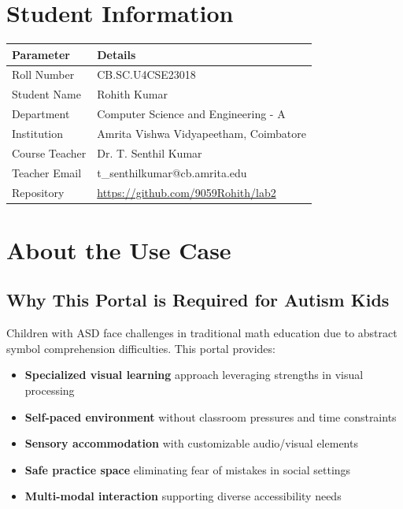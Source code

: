 \documentclass[11pt, a4paper]{article}
\begin{document}
\section{Student Information}

\vspace{0.3cm}
\renewcommand{\arraystretch}{1.4}
\begin{tabular}{ll}
\toprule
\textbf{Parameter} & \textbf{Details} \\
\midrule
Roll Number & CB.SC.U4CSE23018 \\
Student Name & Rohith Kumar \\
Department & Computer Science and Engineering - A \\
Institution & Amrita Vishwa Vidyapeetham, Coimbatore \\
Course Teacher & Dr. T. Senthil Kumar \\
Teacher Email & t\_senthilkumar@cb.amrita.edu \\
Repository & \url{https://github.com/9059Rohith/lab2} \\
\bottomrule
\end{tabular}
\renewcommand{\arraystretch}{1}
\vspace{0.4cm}

\section{About the Use Case}

\subsection{Why This Portal is Required for Autism Kids}

Children with ASD face challenges in traditional math education due to abstract symbol comprehension difficulties. This portal provides:
\begin{itemize}[leftmargin=*, itemsep=3pt, topsep=5pt]
    \item \textbf{Specialized visual learning} approach leveraging strengths in visual processing
    \item \textbf{Self-paced environment} without classroom pressures and time constraints
    \item \textbf{Sensory accommodation} with customizable audio/visual elements
    \item \textbf{Safe practice space} eliminating fear of mistakes in social settings
    \item \textbf{Multi-modal interaction} supporting diverse accessibility needs
\end{itemize}
\end{document}
